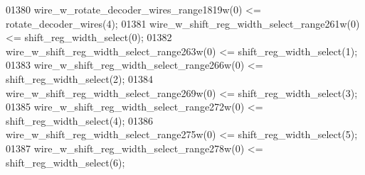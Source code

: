 \begin{DoxyCode}
{01380     \textcolor{vhdlchar}{wire_w_rotate_decoder_wires_range1819w}\textcolor{vhdlchar}{(}\textcolor{vhdllogic}{}\textcolor{vhdllogic}{0}\textcolor{vhdlchar}{)} \textcolor{vhdlchar}{<=} \textcolor{vhdlchar}{rotate_decoder_wires}\textcolor{vhdlchar}{(}\textcolor{vhdllogic}{}\textcolor{vhdllogic}{4}\textcolor{vhdlchar}{)};
01381     \textcolor{vhdlchar}{wire_w_shift_reg_width_select_range261w}\textcolor{vhdlchar}{(}\textcolor{vhdllogic}{}\textcolor{vhdllogic}{0}\textcolor{vhdlchar}{)} \textcolor{vhdlchar}{<=} \textcolor{vhdlchar}{shift_reg_width_select}\textcolor{vhdlchar}{(}\textcolor{vhdllogic}{}\textcolor{vhdllogic}{0}\textcolor{vhdlchar}{)};
01382     \textcolor{vhdlchar}{wire_w_shift_reg_width_select_range263w}\textcolor{vhdlchar}{(}\textcolor{vhdllogic}{}\textcolor{vhdllogic}{0}\textcolor{vhdlchar}{)} \textcolor{vhdlchar}{<=} \textcolor{vhdlchar}{shift_reg_width_select}\textcolor{vhdlchar}{(}\textcolor{vhdllogic}{}\textcolor{vhdllogic}{1}\textcolor{vhdlchar}{)};
01383     \textcolor{vhdlchar}{wire_w_shift_reg_width_select_range266w}\textcolor{vhdlchar}{(}\textcolor{vhdllogic}{}\textcolor{vhdllogic}{0}\textcolor{vhdlchar}{)} \textcolor{vhdlchar}{<=} \textcolor{vhdlchar}{shift_reg_width_select}\textcolor{vhdlchar}{(}\textcolor{vhdllogic}{}\textcolor{vhdllogic}{2}\textcolor{vhdlchar}{)};
01384     \textcolor{vhdlchar}{wire_w_shift_reg_width_select_range269w}\textcolor{vhdlchar}{(}\textcolor{vhdllogic}{}\textcolor{vhdllogic}{0}\textcolor{vhdlchar}{)} \textcolor{vhdlchar}{<=} \textcolor{vhdlchar}{shift_reg_width_select}\textcolor{vhdlchar}{(}\textcolor{vhdllogic}{}\textcolor{vhdllogic}{3}\textcolor{vhdlchar}{)};
01385     \textcolor{vhdlchar}{wire_w_shift_reg_width_select_range272w}\textcolor{vhdlchar}{(}\textcolor{vhdllogic}{}\textcolor{vhdllogic}{0}\textcolor{vhdlchar}{)} \textcolor{vhdlchar}{<=} \textcolor{vhdlchar}{shift_reg_width_select}\textcolor{vhdlchar}{(}\textcolor{vhdllogic}{}\textcolor{vhdllogic}{4}\textcolor{vhdlchar}{)};
01386     \textcolor{vhdlchar}{wire_w_shift_reg_width_select_range275w}\textcolor{vhdlchar}{(}\textcolor{vhdllogic}{}\textcolor{vhdllogic}{0}\textcolor{vhdlchar}{)} \textcolor{vhdlchar}{<=} \textcolor{vhdlchar}{shift_reg_width_select}\textcolor{vhdlchar}{(}\textcolor{vhdllogic}{}\textcolor{vhdllogic}{5}\textcolor{vhdlchar}{)};
01387     \textcolor{vhdlchar}{wire_w_shift_reg_width_select_range278w}\textcolor{vhdlchar}{(}\textcolor{vhdllogic}{}\textcolor{vhdllogic}{0}\textcolor{vhdlchar}{)} \textcolor{vhdlchar}{<=} \textcolor{vhdlchar}{shift_reg_width_select}\textcolor{vhdlchar}{(}\textcolor{vhdllogic}{}\textcolor{vhdllogic}{6}\textcolor{vhdlchar}{)};
}
\end{DoxyCode}
